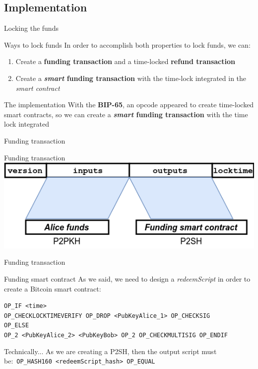 \documentclass{beamer}
\begin{document}
\subsection{Implementation}
\begin{frame}{Locking the funds}
 \begin{block}{Ways to lock funds}
  In order to accomplish both properties to lock funds, we can:
  \begin{enumerate}
   \item Create a \textbf{funding transaction} and a time-locked \textbf{refund transaction}
   \item Create a \textbf{\textit{smart} funding transaction} with
         the time-lock integrated in the \textit{smart contract}
  \end{enumerate}
 \end{block}
 \pause
 \begin{block}{The implementation}
  With the \textbf{BIP-65}, an opcode appeared to create time-locked smart contracts, so we can create a \textbf{\textit{smart} funding transaction} with the time lock integrated
 \end{block}
\end{frame}
\begin{frame}{Funding transaction}
 \begin{exampleblock}{Funding transaction}
  \includegraphics[width=\textwidth, height=0.8\textheight, keepaspectratio]{img/unidir_tx_funding.png}
 \end{exampleblock}
 \pause
\end{frame}
\begin{frame}{Funding transaction}
 \begin{exampleblock}{Funding smart contract}
  As we said, we need to design a \textit{redeemScript} in order to create a Bitcoin smart contract:
  \pause
  \begin{center}
   \texttt{OP\_IF <time>}\\
   \texttt{OP\_CHECKLOCKTIMEVERIFY OP\_DROP <PubKeyAlice\_1> OP\_CHECKSIG}\\
   \texttt{OP\_ELSE}\\
   \texttt{OP\_2 <PubKeyAlice\_2> <PubKeyBob> OP\_2 OP\_CHECKMULTISIG OP\_ENDIF}
  \end{center}
 \end{exampleblock}
 \pause
 \begin{exampleblock}{Technically...}
  As we are creating a P2SH, then the output script must be:\
  \texttt{OP\_HASH160 <redeemScript\_hash> OP\_EQUAL}
 \end{exampleblock}
\end{frame}
\end{document}
